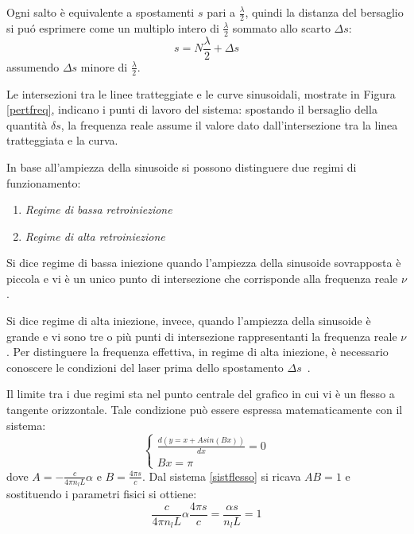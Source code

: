 Ogni salto è equivalente a spostamenti $s$ pari a $\frac{\lambda}{2}$, quindi la distanza del bersaglio si puó esprimere come un multiplo intero di $\frac{\lambda}{2}$ sommato allo scarto $\Delta s$:
\begin{equation}
	s= N \frac{\lambda}{2} + \Delta s
\end{equation}
assumendo $\Delta s$ minore di $\frac{\lambda}{2}$.

Le intersezioni tra le linee tratteggiate e le curve sinusoidali, mostrate in Figura \ref{pertfreq}, indicano i punti di lavoro del sistema: spostando il bersaglio della quantità $\delta s$, la frequenza reale assume il valore dato dall'intersezione tra la linea tratteggiata e la curva.

In base all'ampiezza della sinusoide si possono distinguere due regimi di funzionamento:
\begin{enumerate}
	\item \textit{Regime di bassa retroiniezione}
	\item \textit{Regime di alta retroiniezione}
\end{enumerate}

Si dice regime di bassa iniezione quando l'ampiezza della sinusoide sovrapposta è piccola e vi è un unico punto di intersezione che corrisponde alla frequenza reale $\nu$.

Si dice regime di alta iniezione, invece, quando l'ampiezza della sinusoide è grande e vi sono tre o più punti di intersezione rappresentanti la frequenza reale $\nu$. Per distinguere la frequenza effettiva, in regime di alta iniezione, è necessario conoscere le condizioni del laser prima dello spostamento $\Delta s$~\cite{randonethesis}.

Il limite tra i due regimi sta nel punto centrale del grafico in cui vi è un flesso a tangente orizzontale. Tale condizione può essere espressa matematicamente con il sistema:
\begin{equation}
	\begin{cases}
   \frac{d(y=x+Asin(Bx))}{dx}=0\\Bx=\pi
   \end{cases}
   \label{sistflesso}
\end{equation}
dove $A=- \frac{c}{4 \pi n_l L}\alpha$ e $B=\frac{4\pi s}{c}$. Dal sistema \ref{sistflesso} si ricava $AB=1$ e sostituendo i parametri fisici si ottiene:
\begin{equation}
	\frac{c}{4 \pi n_l L} \alpha \frac{4\pi s}{c} = \frac{\alpha s}{n_l L} = 1
\end{equation}


